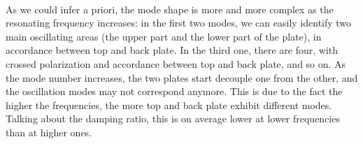 \documentclass[a4paper,12pt,oneside]{article}
\begin{document}
\begin{figure}[H]
	 \\
	\begin{center}
	\end{center}
\end{figure}

As we could infer a priori, the mode shape is more and more complex as the resonating frequency increases: in the first two modes, we can easily identify two main oscillating areas (the upper part and the lower part of the plate), in accordance between top and back plate. In the third one, there are four, with crossed polarization and accordance between top and back plate, and so on. As the mode number increases, the two plates start decouple one from the other, and the oscillation modes may not correspond anymore. This is due to the fact the higher the frequencies, the more top and back plate exhibit different modes. Talking about the damping ratio, this is on average lower at lower frequencies than at higher ones.
\end{document}
